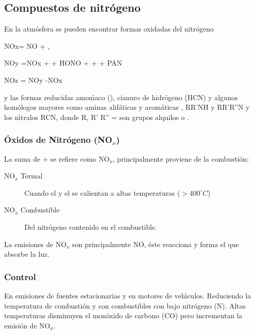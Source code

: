 \subsection{Compuestos de nitrógeno}
En la atmósfera se pueden encontrar formas oxidadas del nitrógeno 

NOx= NO + ,

NOy =NOx +  + HONO +  +  + PAN

NOz = NOy -NOx

y las formas reducidas amon\'{\i}aco (), cianuro de hidrógeno (HCN)  y algunos homólogos mayores como aminas alifáticas y aromáticas  , RR'NH y RR'R''N y los n\'{\i}tralos RCN, donde R, R' R'' = son grupos alquilos  o  .

\subsubsection{\'Oxidos de Nitr\'ogeno (NO$_x$)}
La suma de  +  se refiere como NO$_x$, principalmente proviene de la combusti\'on:
\begin{description}
\item[NO$_x$ Termal] Cuando el   y el  se calientan a altas temperaturas
($>400^\circ C$)
\item[NO$_x$ Combustible] Del nitr\'ogeno contenido en el combustible.
\end{description}
La emisiones de NO$_x$ son principalmente NO, \'este reacciona y forma el  que absorbe la luz.

\subsubsection{Control} En emisiones de fuentes estacionarias y en motores de veh\'{\i}culos. Reduciendo la temperatura de combusti\'on y con combustibles con bajo nitrógeno (N). Altas temperaturas disminuyen el monóxido de carbono (CO) pero incrementan la emisión de  NO$_x$.


